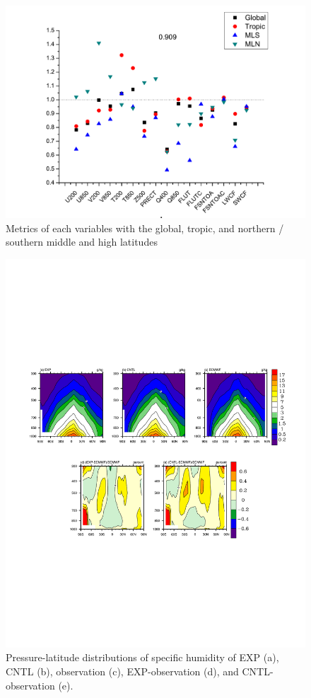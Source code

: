 \documentclass[gmd, manuscript]{copernicus}
\begin{document}
\begin{figure}[t]
\includegraphics[width=15.3cm]{reg}
\caption{Metrics of each variables with the global, tropic, and northern / southern middle and high latitudes}
\end{figure}

\begin{figure}[t]
\includegraphics[width=15.3cm]{shum}
\caption{Pressure-latitude distributions of specific humidity of EXP (a), CNTL (b), observation (c), EXP-observation (d), and CNTL-observation (e).}
\end{figure}
\end{document}
